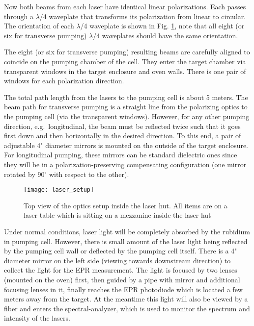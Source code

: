 {Now both beams from each laser have identical linear
polarizations.  Each passes through a $\lambda$/4 waveplate that
transforms its polarization from linear to circular.  The orientation of 
each $\lambda$/4 waveplate is shown in Fig. \ref{fig:laser_setup}, note that 
all eight (or six for transverse pumping) $\lambda$/4 waveplates should have 
the same orientation.

The eight (or six for transverse pumping)
resulting beams are carefully aligned to coincide on the pumping chamber 
of the cell.  They enter the target chamber via transparent
windows in the target enclosure and oven walls. There is one
pair of windows for each polarization direction.

The total path length from the lasers to the pumping cell is about 5
meters.  The beam path for transverse pumping is a straight line from
the polarizing optics to the pumping cell (via the transparent
windows).  However, for any other pumping direction, e.g.\
longitudinal, the beam must be reflected twice such that it goes first
down and then horizontally in the desired direction.  To this end, a
pair of adjustable 4" diameter mirrors is mounted on the outside of
the target enclosure.  For longitudinal pumping, these mirrors can be
standard dielectric ones since they will be in a
polarization-preserving compensating configuration (one mirror rotated
by 90$^\circ$ with respect to the other).  

\begin{figure}
\begin{center}
\centerline{\texttt{[image: laser\_setup]}}
\end{center}
\caption[Top view of the optics setup inside the laser hut]%
{Top view of the optics setup inside the laser hut. All items
are on a laser table
which is sitting on a mezzanine inside the laser hut}
\label{fig:laser_setup}
\end{figure}

Under normal conditions, laser light
will be completely absorbed by the rubidium in pumping cell.  
However, there is small amount of the laser light being reflected by 
the pumping cell wall or deflected by the pumping cell itself. 
There is a 4" diameter mirror on the left side (viewing
towards downstream direction) to collect the light for the EPR measurement.  
The light is focused by two lenses (mounted on the oven) first, then guided
by a pipe with mirror and additional focusing lenses in it, finally reaches 
the EPR photodiode which is located a few meters away from the target.
At the meantime this light will also be viewed by a fiber and enters 
the spectral-analyzer, which is used to monitor the spectrum and intensity of 
the lasers.

}
